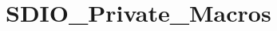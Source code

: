 \hypertarget{group___s_d_i_o___private___macros}{\section{S\-D\-I\-O\-\_\-\-Private\-\_\-\-Macros}
\label{group___s_d_i_o___private___macros}
}
